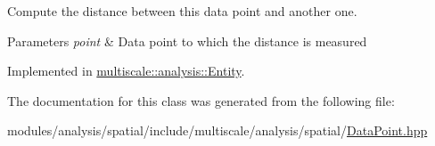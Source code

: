 Compute the distance between this data point and another one. 


\begin{DoxyParams}{Parameters}
{\em point} & Data point to which the distance is measured \\
\hline
\end{DoxyParams}


Implemented in \hyperlink{classmultiscale_1_1analysis_1_1Entity_a39cb4bb856c295c82676085d976d58e8}{multiscale\-::analysis\-::\-Entity}.



The documentation for this class was generated from the following file\-:\begin{DoxyCompactItemize}
\item 
modules/analysis/spatial/include/multiscale/analysis/spatial/\hyperlink{DataPoint_8hpp}{Data\-Point.\-hpp}\end{DoxyCompactItemize}
